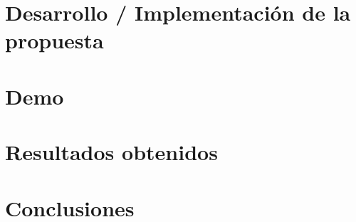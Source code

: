 \documentclass{beamer}
\begin{document}
  \section{Desarrollo / Implementación de la propuesta}
  
  \section{Demo}
  
  \section{Resultados obtenidos}
  
  \section{Conclusiones} %
\end{document}
